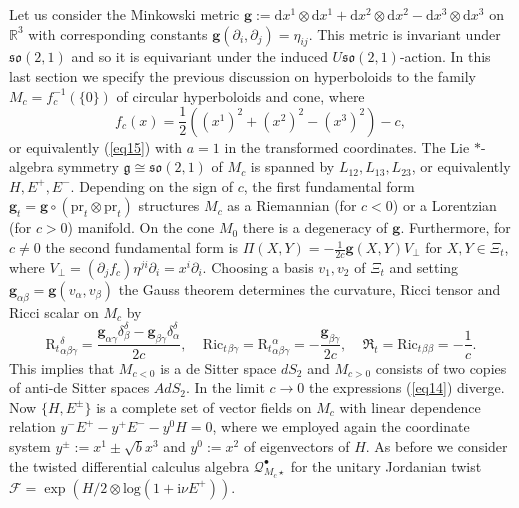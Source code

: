 \documentclass[a4paper,11pt]{article}
\begin{document}
Let us consider the Minkowski metric
$\mathbf{g}:=\mathrm{d}x^1\otimes\mathrm{d}x^1+\mathrm{d}x^2\otimes\mathrm{d}x^2
-\mathrm{d}x^3\otimes\mathrm{d}x^3$ on $\mathbb{R}^3$ with corresponding constants
$\mathbf{g}(\partial_i,\partial_j)=\eta_{ij}$. This metric is invariant under
$\mathfrak{so}(2,1)$ and so it is equivariant under the induced
$U\mathfrak{so}(2,1)$-action.
In this last section we specify the previous discussion on hyperboloids to the family
$M_c=f^{-1}_c(\{0\})$ of circular hyperboloids and cone, where
\begin{equation}
    f_c(x)=\frac{1}{2}((x^1)^2+(x^2)^2-(x^3)^2)-c,
\end{equation}
or equivalently (\ref{eq15}) with $a=1$ in the transformed coordinates.
The Lie $*$-algebra symmetry $\mathfrak{g}\cong\mathfrak{so}(2,1)$ of $M_c$ is spanned
by $L_{12},L_{13},L_{23}$, or equivalently $H,E^+,E^-$. Depending on the sign of $c$, the first fundamental form
$\mathbf{g}_t=\mathbf{g}\circ(\mathrm{pr}_t\otimes\mathrm{pr}_t)$ structures
$M_c$ as a Riemannian (for $c<0$) or a Lorentzian (for $c>0$) manifold.
On the cone $M_0$ there is a degeneracy of $\mathbf{g}$. Furthermore,
for $c\neq 0$ the second
fundamental form is $\Pi(X,Y)=-\frac{1}{2c}\mathbf{g}(X,Y)V_\perp$ for $X,Y\in\Xi_t$,
where $V_\perp=(\partial_jf_c)\eta^{ji}\partial_i=x^i\partial_i$.
Choosing a basis $v_1,v_2$ of $\Xi_t$ and setting
$\mathbf{g}_{\alpha\beta}=\mathbf{g}(v_\alpha,v_\beta)$ the Gauss theorem determines
the curvature, Ricci tensor and Ricci scalar on $M_c$ by
\begin{equation}\label{eq14}
    \mathrm{R}_t{}^\delta_{\alpha\beta\gamma}
    =\frac{\mathbf{g}_{\alpha\gamma}\delta^\delta_\beta
    -\mathbf{g}_{\beta\gamma}\delta^\delta_\alpha}{2c},~~~~~
    \mathrm{Ric}_t{}_{\beta\gamma}
    =\mathrm{R}_t{}^\alpha_{\alpha\beta\gamma}
    =-\frac{\mathbf{g}_{\beta\gamma}}{2c},~~~~~
    \mathfrak{R}_t=\mathrm{Ric}_t{}_{\beta\beta}=-\frac{1}{c}.
\end{equation}
This implies that $M_{c<0}$ is a de Sitter space $dS_2$ and
$M_{c>0}$ consists of two copies of anti-de Sitter spaces $AdS_2$. In the limit
$c\rightarrow 0$ the expressions (\ref{eq14}) diverge.
Now $\{H,E^\pm\}$ is a complete set of vector fields on $M_c$ with linear dependence
relation $y^-E^+-y^+E^--y^0H=0$, where we employed again the coordinate system
$y^\pm:=x^1\pm\sqrt{b}x^3$ and $y^0:=x^2$ of eigenvectors of $H$.
As before we consider the twisted differential calculus algebra
$\mathcal{Q}^\bullet_{M_c\star}$ for the unitary Jordanian twist
$\mathcal{F}=\exp(H/2\otimes\mathrm{log}(1+\mathrm{i}\nu E^+))$.
\end{document}
